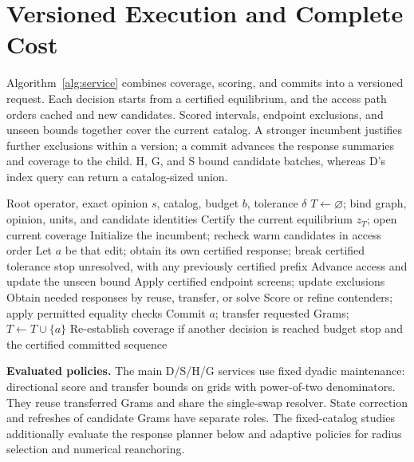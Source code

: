 \section{Versioned Execution and Complete Cost}
\label{sec:execution}

Algorithm~\ref{alg:service} combines coverage, scoring, and commits into a versioned request. Each decision starts from a certified equilibrium, and the access path orders cached and new candidates. Scored intervals, endpoint exclusions, and unseen bounds together cover the current catalog. A stronger incumbent justifies further exclusions within a version; a commit advances the response summaries and coverage to the child. H, G, and S bound candidate batches, whereas D's index query can return a catalog-sized union.

\begin{algorithm}[t]
\caption{Certified current-catalog service}
\label{alg:service}
\begin{algorithmic}[1]
\Require Root operator, exact opinion $s$, catalog, budget $b$, tolerance $\delta$
\State $T\gets\varnothing$; bind graph, opinion, units, and candidate identities
  \State Certify the current equilibrium $z_T$; open current coverage
  \State Initialize the incumbent; recheck warm candidates in access order
       \State Let $a$ be that edit; obtain its own certified response; break
       \State \Return certified tolerance stop
       \State \Return unresolved, with any previously certified prefix
    \EndIf
       \State Advance access and update the unseen bound
       \State Apply certified endpoint screens; update exclusions
    \EndIf
    \State Obtain needed responses by reuse, transfer, or solve
    \State Score or refine contenders; apply permitted equality checks
  \EndWhile
  \State Commit $a$; transfer requested Grams; $T\gets T\cup\{a\}$
  \State Re-establish coverage if another decision is reached
\EndWhile
\State \Return budget stop and the certified committed sequence
\end{algorithmic}
\end{algorithm}

\textbf{Evaluated policies.} The main D/S/H/G services use fixed dyadic maintenance: directional score and transfer bounds on grids with power-of-two denominators. They reuse transferred Grams and share the single-swap resolver. State correction and refreshes of candidate Grams have separate roles. The fixed-catalog studies additionally evaluate the response planner below and adaptive policies for radius selection and numerical reanchoring.

